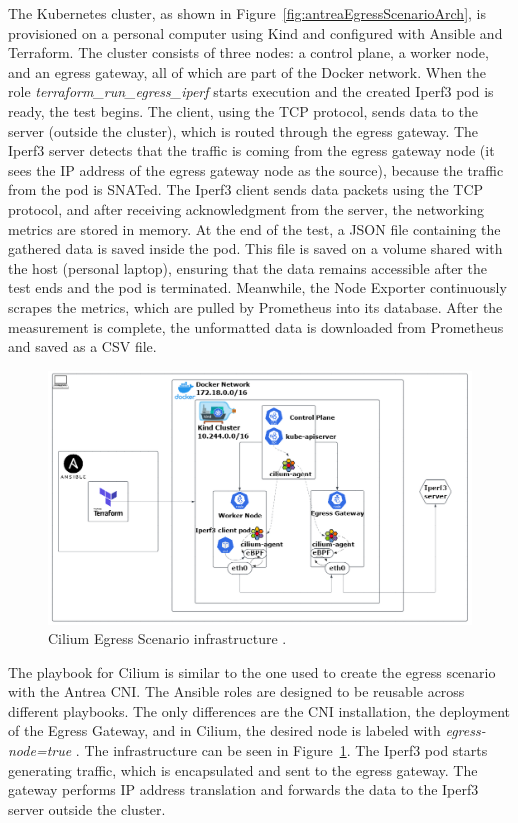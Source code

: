 The Kubernetes cluster, as shown in Figure~\ref{fig:antreaEgressScenarioArch}, is provisioned on a personal computer using Kind and configured with Ansible and Terraform. The cluster consists of three nodes: a control plane, a worker node, and an egress gateway, all of which are part of the Docker network. When the role \textit{terraform\_run\_egress\_iperf} starts execution and the created Iperf3 pod is ready, the test begins. The client, using the TCP protocol, sends data to the server (outside the cluster), which is routed through the egress gateway. The Iperf3 server detects that the traffic is coming from the egress gateway node (it sees the IP address of the egress gateway node as the source), because the traffic from the pod is SNATed. The Iperf3 client sends data packets using the TCP protocol, and after receiving acknowledgment from the server, the networking metrics are stored in memory. At the end of the test, a JSON file containing the gathered data is saved inside the pod. This file is saved on a volume shared with the host (personal laptop), ensuring that the data remains accessible after the test ends and the pod is terminated. Meanwhile, the Node Exporter continuously scrapes the metrics, which are pulled by Prometheus into its database. After the measurement is complete, the unformatted data is downloaded from Prometheus and saved as a CSV file. 

\begin{figure}[H]
  \centering
  \includegraphics[width=1\columnwidth]{images/cilium_egress_gateway_cluster.png}
  \caption{Cilium Egress Scenario infrastructure \cite{CiliumDocs}.}
  \label{fig:ciliumEgressGatewayScenarioArch}
\end{figure}

The playbook for Cilium is similar to the one used to create the egress scenario with the Antrea CNI. The Ansible roles are designed to be reusable across different playbooks. The only differences are the CNI installation, the deployment of the Egress Gateway, and in Cilium, the desired node is labeled with \textit{egress-node=true} \cite{CiliumDocs}. The infrastructure can be seen in Figure~\ref{fig:ciliumEgressGatewayScenarioArch}. The Iperf3 pod starts generating traffic, which is encapsulated and sent to the egress gateway. The gateway performs IP address translation and forwards the data to the Iperf3 server outside the cluster.


